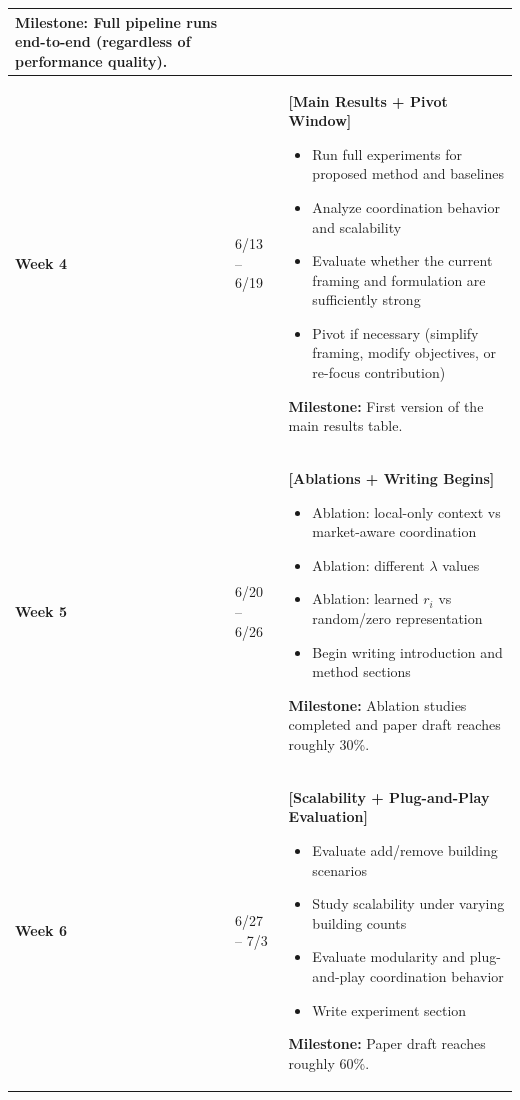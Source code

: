 \documentclass[11pt]{article}
\begin{document}
\begin{longtable}{p{1.8cm} p{2.3cm} p{10.5cm}}
\textbf{Milestone:}
Full pipeline runs end-to-end (regardless of performance quality).
\\

\midrule

\textbf{Week 4} & 6/13 -- 6/19 &
\textbf{[Main Results + Pivot Window]}
\begin{itemize}[leftmargin=1.5em]
    \item Run full experiments for proposed method and baselines
    \item Analyze coordination behavior and scalability
    \item Evaluate whether the current framing and formulation are sufficiently strong
    \item Pivot if necessary (simplify framing, modify objectives, or re-focus contribution)
\end{itemize}

\textbf{Milestone:}
First version of the main results table.
\\

\midrule

\textbf{Week 5} & 6/20 -- 6/26 &
\textbf{[Ablations + Writing Begins]}
\begin{itemize}[leftmargin=1.5em]
    \item Ablation: local-only context vs market-aware coordination
    \item Ablation: different $\lambda$ values
    \item Ablation: learned $r_i$ vs random/zero representation
    \item Begin writing introduction and method sections
\end{itemize}

\textbf{Milestone:}
Ablation studies completed and paper draft reaches roughly 30\%.
\\

\midrule

\textbf{Week 6} & 6/27 -- 7/3 &
\textbf{[Scalability + Plug-and-Play Evaluation]}
\begin{itemize}[leftmargin=1.5em]
    \item Evaluate add/remove building scenarios
    \item Study scalability under varying building counts
    \item Evaluate modularity and plug-and-play coordination behavior
    \item Write experiment section
\end{itemize}

\textbf{Milestone:}
Paper draft reaches roughly 60\%.
\\


\end{longtable}
\end{document}
